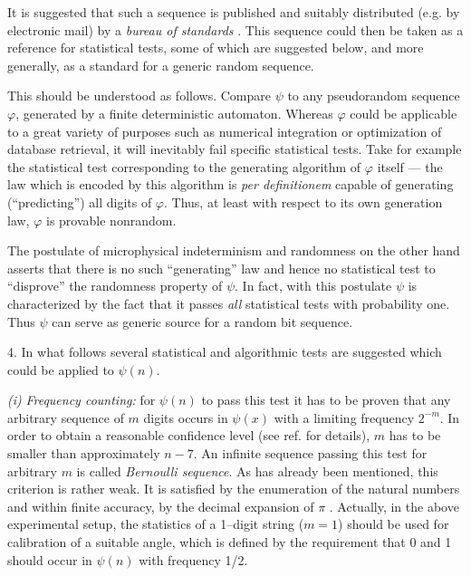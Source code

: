       It is suggested that such a sequence is published and suitably
 distributed (e.g. by electronic mail) by a {\sl bureau of standards}
 \cite{zeilinger1}.  This sequence could then be taken as a reference
 for statistical tests, some of which are suggested below, and more
 generally, as a standard for a generic random sequence.

      This should be understood as follows.  Compare $\psi$ to any
 pseudorandom sequence $\varphi$, generated by a finite deterministic
 automaton.  Whereas $\varphi$ could be applicable to a great variety
 of purposes such as numerical integration or optimization of database
 retrieval, it will inevitably fail specific statistical tests.  Take
 for example the statistical test corresponding to the generating
 algorithm of $\varphi$ itself --- the law which is encoded by this
 algorithm is {\it per definitionem} capable of generating
 (``predicting'') all digits of $\varphi$.  Thus, at least with respect
 to its own generation law, $\varphi$ is provable nonrandom.

      The postulate of microphysical indeterminism and randomness on
 the other hand asserts that there is no such ``generating'' law and
 hence no statistical test to ``disprove'' the randomness property of
 $\psi$.  In fact, with this postulate $\psi$ is characterized by the
 fact that it passes {\it all} statistical tests with probability one.
 Thus $\psi$ can serve as generic source for a random bit sequence.



 4.
 In what follows several statistical and algorithmic tests are
 suggested which could be applied to $\psi (n)$.

 {\it (i)} {\sl Frequency counting:}
 for $\psi (n)$ to pass this test it has to be proven that any
 arbitrary sequence of $m$ digits occurs in $\psi (x)$ with a limiting
 frequency $2^{-m}$. In order to obtain a reasonable confidence level
 (see ref. \cite{knuth1} for details), $m$ has to be
 smaller than approximately $n-7$.
 An infinite sequence passing this test for arbitrary $m$ is called
 {\sl Bernoulli sequence}. As has already been mentioned, this
 criterion is rather weak. It is satisfied by the enumeration of the
 natural numbers \cite{ch1} and within finite accuracy, by the
 decimal expansion of $\pi $ \cite{bailey1}.
 Actually, in the above experimental setup, the statistics of a
 1--digit string ($m=1$) should be used for calibration of a suitable
 angle, which is defined by the requirement that 0 and 1 should occur
 in $\psi (n)$ with frequency 1/2.


